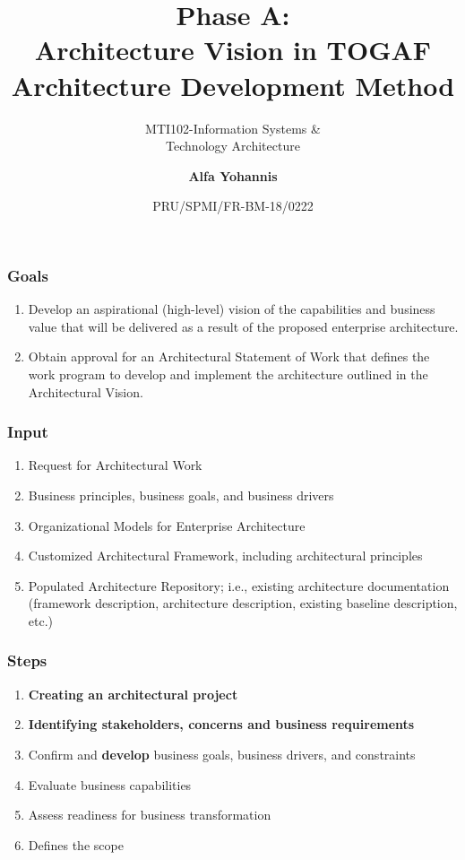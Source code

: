 \documentclass[aspectratio=169, table]{beamer}
\subtitle{MTI102-Information Systems \&\\Technology Architecture}
\title{Phase A:\\Architecture Vision in TOGAF\\Architecture Development Method}
\date[Serial]{\scriptsize {PRU/SPMI/FR-BM-18/0222}}
\author[Pradita]{\small {\textbf{Alfa Yohannis}}}
\begin{document}
    \frame{\titlepage}

    \begin{frame}
        \frametitle{Goals}
        \begin{enumerate}
            \item Develop an aspirational (high-level) vision of the capabilities and business value that will be delivered as a result of the proposed enterprise architecture.
            \item Obtain approval for an Architectural Statement of Work that defines the work program to develop and implement the architecture outlined in the Architectural Vision.
        \end{enumerate}
    \end{frame}

    \begin{frame}
        \frametitle{Input}
        \begin{enumerate}
            \item Request for Architectural Work
            \item Business principles, business goals, and business drivers
            \item Organizational Models for Enterprise Architecture
            \item Customized Architectural Framework, including architectural principles
            \item Populated Architecture Repository; i.e., existing architecture documentation (framework description, architecture description, existing baseline description, etc.)
        \end{enumerate}
    \end{frame}

    \begin{frame}
        \frametitle{Steps}
        \begin{enumerate}

            \item \textbf{Creating an architectural project}
            \item \textbf{Identifying stakeholders, concerns and business requirements}
            \item Confirm and \textbf{develop} business goals, business drivers, and constraints
            \item Evaluate business capabilities
            \item Assess readiness for business transformation
            \item Defines the scope

        \end{enumerate}
    \end{frame}
\end{document}
